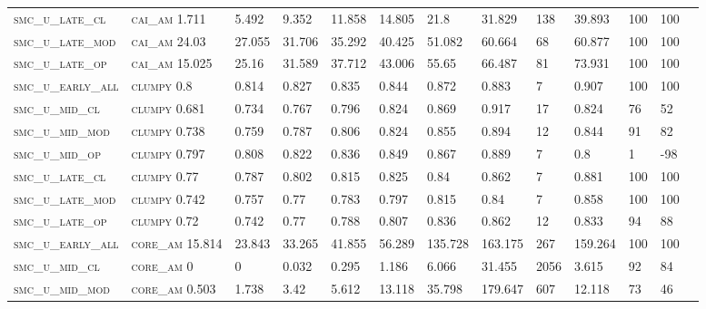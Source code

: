 \begin{landscape}
\begin{center}
\begin{footnotesize}
\begin{longtable}{lllllllllllll}
\textsc{smc\_u\_late\_cl  } & \textsc{cai\_am   }   1.711    & 5.492    & 9.352    & 11.858   & 14.805   & 21.8     & 31.829   & 138  & 39.893   & 100 & 100  \\
\textsc{smc\_u\_late\_mod } & \textsc{cai\_am   }   24.03    & 27.055   & 31.706   & 35.292   & 40.425   & 51.082   & 60.664   & 68   & 60.877   & 100 & 100  \\
\textsc{smc\_u\_late\_op  } & \textsc{cai\_am   }   15.025   & 25.16    & 31.589   & 37.712   & 43.006   & 55.65    & 66.487   & 81   & 73.931   & 100 & 100  \\
\textsc{smc\_u\_early\_all} & \textsc{clumpy    }   0.8      & 0.814    & 0.827    & 0.835    & 0.844    & 0.872    & 0.883    & 7    & 0.907    & 100 & 100  \\
\textsc{smc\_u\_mid\_cl   } & \textsc{clumpy    }   0.681    & 0.734    & 0.767    & 0.796    & 0.824    & 0.869    & 0.917    & 17   & 0.824    & 76  & 52   \\
\textsc{smc\_u\_mid\_mod  } & \textsc{clumpy    }   0.738    & 0.759    & 0.787    & 0.806    & 0.824    & 0.855    & 0.894    & 12   & 0.844    & 91  & 82   \\
\textsc{smc\_u\_mid\_op   } & \textsc{clumpy    }   0.797    & 0.808    & 0.822    & 0.836    & 0.849    & 0.867    & 0.889    & 7    & 0.8      & 1   & -98  \\
\textsc{smc\_u\_late\_cl  } & \textsc{clumpy    }   0.77     & 0.787    & 0.802    & 0.815    & 0.825    & 0.84     & 0.862    & 7    & 0.881    & 100 & 100  \\
\textsc{smc\_u\_late\_mod } & \textsc{clumpy    }   0.742    & 0.757    & 0.77     & 0.783    & 0.797    & 0.815    & 0.84     & 7    & 0.858    & 100 & 100  \\
\textsc{smc\_u\_late\_op  } & \textsc{clumpy    }   0.72     & 0.742    & 0.77     & 0.788    & 0.807    & 0.836    & 0.862    & 12   & 0.833    & 94  & 88   \\
\textsc{smc\_u\_early\_all} & \textsc{core\_am  }   15.814   & 23.843   & 33.265   & 41.855   & 56.289   & 135.728  & 163.175  & 267  & 159.264  & 100 & 100  \\
\textsc{smc\_u\_mid\_cl   } & \textsc{core\_am  }   0        & 0        & 0.032    & 0.295    & 1.186    & 6.066    & 31.455   & 2056 & 3.615    & 92  & 84   \\
\textsc{smc\_u\_mid\_mod  } & \textsc{core\_am  }   0.503    & 1.738    & 3.42     & 5.612    & 13.118   & 35.798   & 179.647  & 607  & 12.118   & 73  & 46   \\

\end{longtable}
\end{footnotesize}
\end{center}
\end{landscape}
